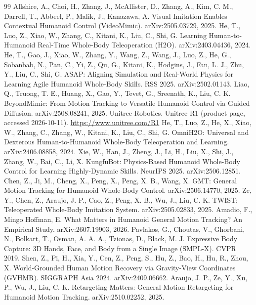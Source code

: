 \documentclass[11pt]{article}
\begin{document}
\begin{thebibliography}{99}\small
\setlength{\itemsep}{0.1em}
 Allshire, A., Choi, H., Zhang, J., McAllister, D., Zhang, A., Kim, C. M., Darrell, T., Abbeel, P., Malik, J., Kanazawa, A. Visual Imitation Enables Contextual Humanoid Control (VideoMimic). arXiv:2505.03729, 2025.
 He, T., Luo, Z., Xiao, W., Zhang, C., Kitani, K., Liu, C., Shi, G. Learning Human-to-Humanoid Real-Time Whole-Body Teleoperation (H2O). arXiv:2403.04436, 2024.
 He, T., Gao, J., Xiao, W., Zhang, Y., Wang, Z., Wang, J., Luo, Z., He, G., Sobanbab, N., Pan, C., Yi, Z., Qu, G., Kitani, K., Hodgins, J., Fan, L. J., Zhu, Y., Liu, C., Shi, G. ASAP: Aligning Simulation and Real-World Physics for Learning Agile Humanoid Whole-Body Skills. RSS 2025. arXiv:2502.01143.
 Liao, Q., Truong, T. E., Huang, X., Gao, Y., Tevet, G., Sreenath, K., Liu, C. K. BeyondMimic: From Motion Tracking to Versatile Humanoid Control via Guided Diffusion. arXiv:2508.08241, 2025.
 Unitree Robotics. Unitree R1 (product page, accessed 2026-10-11). \url{https://www.unitree.com/R1}
 He, T., Luo, Z., He, X., Xiao, W., Zhang, C., Zhang, W., Kitani, K., Liu, C., Shi, G. OmniH2O: Universal and Dexterous Human-to-Humanoid Whole-Body Teleoperation and Learning. arXiv:2406.08858, 2024.
 Xie, W., Han, J., Zheng, J., Li, H., Liu, X., Shi, J., Zhang, W., Bai, C., Li, X. KungfuBot: Physics-Based Humanoid Whole-Body Control for Learning Highly-Dynamic Skills. NeurIPS 2025. arXiv:2506.12851.
 Chen, Z., Ji, M., Cheng, X., Peng, X., Peng, X. B., Wang, X. GMT: General Motion Tracking for Humanoid Whole-Body Control. arXiv:2506.14770, 2025.
 Ze, Y., Chen, Z., Araujo, J. P., Cao, Z., Peng, X. B., Wu, J., Liu, C. K. TWIST: Teleoperated Whole-Body Imitation System. arXiv:2505.02833, 2025.
 Amadio, F., Mingo Hoffman, E. What Matters in Humanoid General Motion Tracking? An Empirical Study. arXiv:2607.19903, 2026.
 Pavlakos, G., Choutas, V., Ghorbani, N., Bolkart, T., Osman, A. A. A., Tzionas, D., Black, M. J. Expressive Body Capture: 3D Hands, Face, and Body from a Single Image (SMPL-X). CVPR 2019.
 Shen, Z., Pi, H., Xia, Y., Cen, Z., Peng, S., Hu, Z., Bao, H., Hu, R., Zhou, X. World-Grounded Human Motion Recovery via Gravity-View Coordinates (GVHMR). SIGGRAPH Asia 2024. arXiv:2409.06662.
 Araujo, J. P., Ze, Y., Xu, P., Wu, J., Liu, C. K. Retargeting Matters: General Motion Retargeting for Humanoid Motion Tracking. arXiv:2510.02252, 2025.

\end{thebibliography}
\end{document}

